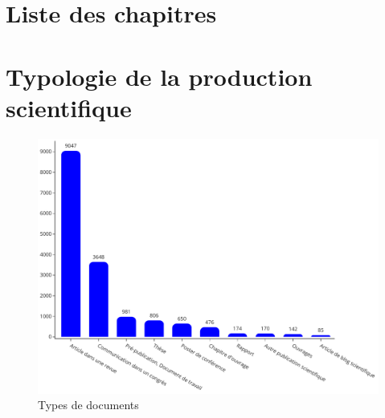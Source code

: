 \documentclass[french, 11pt]{../../dibiso/biso}
\begin{document}







\pagebreak

\section{Liste des chapitres}

{
  \footnotesize
  
}







\pagebreak

\section{Typologie de la production scientifique}

\begin{figure}[!h]
  \includegraphics[width=\textwidth]{figures/works_type.pdf}
  \centering
  \caption{Types de documents}
  \label{fig_doc_type}
\end{figure}

\end{document}
